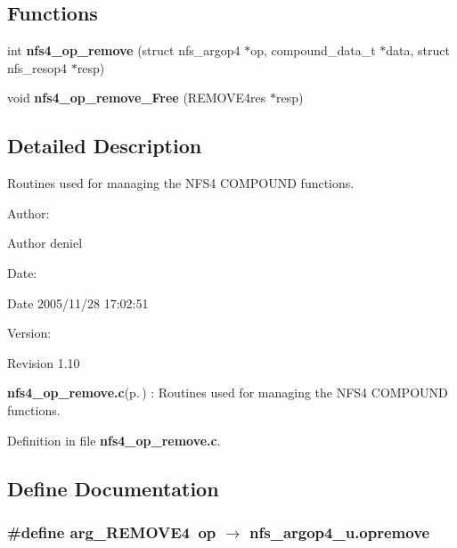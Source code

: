 \subsection*{Functions}
\begin{CompactItemize}
\item 
int {\bf nfs4\_\-op\_\-remove} (struct nfs\_\-argop4 $\ast$op, compound\_\-data\_\-t $\ast$data, struct nfs\_\-resop4 $\ast$resp)
\item 
void {\bf nfs4\_\-op\_\-remove\_\-Free} (REMOVE4res $\ast$resp)
\end{CompactItemize}


\subsection{Detailed Description}
Routines used for managing the NFS4 COMPOUND functions. 

\begin{Desc}
\item[Author:]\begin{Desc}
\item[Author]deniel \end{Desc}
\end{Desc}
\begin{Desc}
\item[Date:]\begin{Desc}
\item[Date]2005/11/28 17:02:51 \end{Desc}
\end{Desc}
\begin{Desc}
\item[Version:]\begin{Desc}
\item[Revision]1.10 \end{Desc}
\end{Desc}
{\bf nfs4\_\-op\_\-remove.c}{\rm (p.\,\pageref{nfs4__op__remove_8c})} : Routines used for managing the NFS4 COMPOUND functions.

Definition in file {\bf nfs4\_\-op\_\-remove.c}.

\subsection{Define Documentation}
\subsubsection{\setlength{\rightskip}{0pt plus 5cm}\#define arg\_\-REMOVE4\ op $\rightarrow$ nfs\_\-argop4\_\-u.opremove}\label{nfs4__op__remove_8c_a0}


